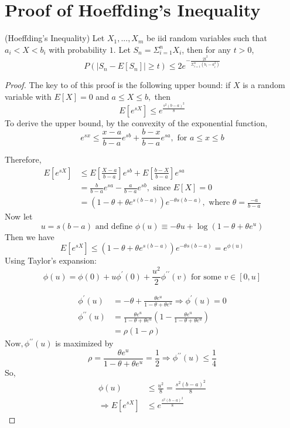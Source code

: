 \section{Proof of Hoeffding’s Inequality}
\begin{definition}
(Hoeffding's Inequality)
Let $X_{1},...,X_{m}$ be iid random variables such that $a_{i}<X<b_{i}$ with probability $1$. Let $S_{n} = \Sigma_{i=1}^{n}X_{i}$, then for any $t>0$,  
\begin{equation*}
    P(|S_{n} - E[S_{n}]|\geq t) \leq 2e^{- \frac{2t^2}{\Sigma_{i=1}^{n}(b_{i}-a_{i}^{2})}}
\end{equation*}
\end{definition}

\begin{proof}
The key to of this proof is the following upper bound: if $X$ is a random variable with $E[X]=0$ and $a \leq X \leq b,$ then
$$
E\left[e^{s X}\right] \leq e^{\frac{s^{2}(b-a)^{2}}{8}}
$$
To derive the upper bound, by the convexity of the exponential function,
$$
e^{s x} \leq \frac{x-a}{b-a} e^{s b}+\frac{b-x}{b-a} e^{s a}, \text { for } a \leq x \leq b
$$

Therefore,
$$
\begin{aligned}
E\left[e^{s X}\right] & \leq E\left[\frac{X-a}{b-a}\right] e^{s b}+E\left[\frac{b-X}{b-a}\right] e^{s a} \\
&=\frac{b}{b-a} e^{s a}-\frac{a}{b-a} e^{s b}, \text { since } E[X]=0 \\
&=\left(1-\theta+\theta e^{s(b-a)}\right) e^{-\theta s(b-a)}, \text { where } \theta=\frac{-a}{b-a}
\end{aligned}
$$
Now let
$$
u=s(b-a) \text { and define } \phi(u) \equiv-\theta u+\log \left(1-\theta+\theta e^{u}\right)
$$
Then we have
$$
E\left[e^{s X}\right] \leq\left(1-\theta+\theta e^{s(b-a)}\right) e^{-\theta s(b-a)}=e^{\phi(u)}
$$
Using Taylor's expansion:
$$
\phi(u)=\phi(0)+u \phi^{\prime}(0)+\frac{u^{2}}{2} \phi^{\prime \prime}(v) \text { for some } v \in[0, u]
$$

$$
\begin{aligned}
\phi^{\prime}(u) &=-\theta+\frac{\theta e^{u}}{1-\theta+\theta e^{u}} \Rightarrow \phi^{\prime}(u)=0 \\
\phi^{\prime \prime}(u) &=\frac{\theta e^{u}}{1-\theta+\theta e^{u}}\left(1-\frac{\theta e^{u}}{1-\theta+\theta e^{u}}\right) \\
&=\rho(1-\rho)
\end{aligned}
$$
$\mathrm{Now}, \phi^{\prime \prime}(u)$ is maximized by
$$
\rho=\frac{\theta e^{u}}{1-\theta+\theta e^{u}}=\frac{1}{2} \Rightarrow \phi^{\prime \prime}(u) \leq \frac{1}{4}
$$
So,
$$
\begin{aligned}
\phi(u) & \leq \frac{u^{2}}{8}=\frac{s^{2}(b-a)^{2}}{8} \\
\Rightarrow E\left[e^{s X}\right] & \leq e^{\frac{s^{2}(b-a)^{2}}{8}}
\end{aligned}
$$


\end{proof}
